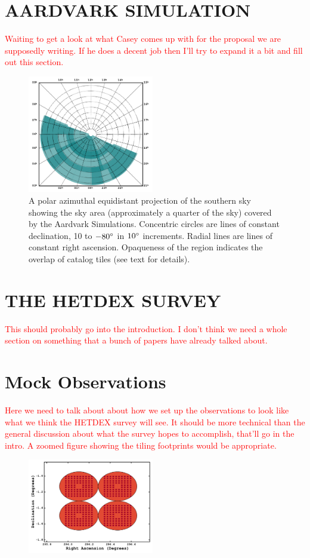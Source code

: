 \documentclass[apj, revtex4]{emulateapj}
\newcommand{\editorial}[1]{\textcolor{red}{#1} }
\begin{document}
\section{AARDVARK SIMULATION}
\editorial{Waiting to get a look at what Casey comes up with for the proposal we are supposedly writing. If he does a decent job then I'll try to expand it a bit and fill out this section.}
\begin{figure} 
	\includegraphics[width=0.49\textwidth]{surveyArea.pdf} 
	\caption{A polar azimuthal equidistant projection of the southern sky showing the sky area (approximately a quarter of the sky) covered by the Aardvark Simulations. Concentric circles are lines of constant declination, 10 to $-80\hbox{$^\circ$}$ in $10\hbox{$^\circ$}$ increments. Radial lines are lines of constant right ascension. Opaqueness of the region indicates the overlap of catalog tiles (see text for details).} 
	\label{fig:survey area} 
\end{figure}

\section{THE HETDEX SURVEY}
\editorial{This should probably go into the introduction. I don't think we need a whole section on something that a bunch of papers have already talked about.}

\section{Mock Observations}
\editorial{Here we need to talk about about how we set up the observations to look like what we think the HETDEX survey will see. It should be more technical than the general discussion about what the survey hopes to accomplish, that'll go in the intro. A zoomed figure showing the tiling footprints would be appropriate.}

\begin{figure} 
	\includegraphics[width=0.49\textwidth]{f01.pdf} 
	\caption{} \label{fig:ifu layout} 
\end{figure}
\end{document}
